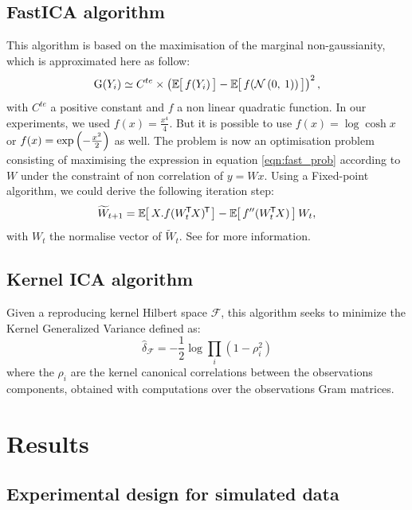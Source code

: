 \documentclass[a4paper]{article}
\newcommand{\zZ}[2]{\mathrm #1\!\zp{#2}}
\newcommand{\Ng}[2]{\mathcal{N}\zp{#1,\:#2}}
\begin{document}
\subsection{FastICA algorithm}
This algorithm is based on the maximisation of the marginal non-gaussianity, which is approximated here as follow:
\begin{equation}\label{eqn:fast_prob}
  \zZ G{Y_i} \simeq C^{te}\times\zp{\zesp{f(Y_i)} - \zesp{f(\Ng 01)}}^2,
\end{equation}
with $C^{te}$ a positive constant and $f$ a non linear quadratic function.
In our experiments, we used $f(x) = \frac{x^4}4$. But it is possible to use $f(x) = \log \cosh x$ or $f(x) = \exp\zp{-\frac{x^2}2}$ as well.
The problem is now an optimisation problem consisting of maximising the expression in equation \ref{eqn:fast_prob} according to $W$ under the constraint of non correlation of $y = Wx$. Using a Fixed-point algorithm, we could derive the following iteration step:
\begin{equation}
  \widetilde W_{t+1} = \zesp{X.\ztr{f(\ztr{W_t}X)}} - \zesp{f''(\ztr{W_t}X)}W_t,
\end{equation}
with $W_t$ the normalise vector of $\widetilde W_t$. See \cite{hyvarinen99} for more information.

\subsection{Kernel ICA algorithm}
Given a reproducing kernel Hilbert space $\mathcal{F}$, this algorithm seeks to minimize the Kernel Generalized Variance defined as:
\begin{equation}
	\widehat{\delta}_{\mathcal{F}}=-\frac{1}{2}\log \underset{i}{\prod}(1-\rho_i^2)
\end{equation}
where the $\rho_i$ are the kernel canonical correlations between the observations components, obtained with computations over the observations Gram matrices.


\section{Results}

\subsection{Experimental design for simulated data}
\end{document}
